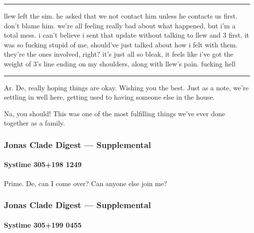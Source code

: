 \begin{center}\rule{0.5\linewidth}{\linethickness}\end{center}

llew left the sim. he asked that we not contact him unless he contacts us first. don't blame him. we're all feeling really bad about what happened, but i'm a total mess. i can't believe i sent that update without talking to llew and 3 first. it was so fucking stupid of me, should've just talked about how i felt with them. they're the ones involved, right? it's just all so bleak, it feels like i've got the weight of 3's line ending on my shoulders, along with llew's pain. fucking hell

\begin{center}\rule{0.5\linewidth}{\linethickness}\end{center}

Ar. De, really hoping things are okay. Wishing you the best. Just as a note, we're settling in well here, getting used to having someone else in the house.

Na, you should! This was one of the most fulfilling things we've ever done together as a family.

\hypertarget{jonas-clade-digest-supplemental-6}{%
\subsubsection{Jonas Clade Digest --- Supplemental}\label{jonas-clade-digest-supplemental-6}}

\hypertarget{systime-305198-1249}{%
\paragraph{Systime 305+198 1249}\label{systime-305198-1249}}

Prime. De, can I come over? Can anyone else join me?

\hypertarget{jonas-clade-digest-supplemental-7}{%
\subsubsection{Jonas Clade Digest --- Supplemental}\label{jonas-clade-digest-supplemental-7}}

\hypertarget{systime-305199-0455}{%
\paragraph{Systime 305+199 0455}\label{systime-305199-0455}}

